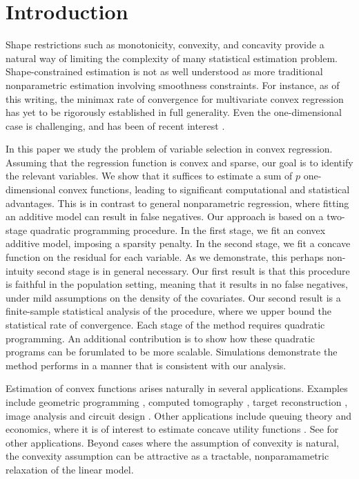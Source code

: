 \section{Introduction}


Shape restrictions such as monotonicity, convexity, and concavity
provide a natural way of limiting the complexity of many statistical
estimation problem.  Shape-constrained estimation is not as well
understood as more traditional nonparametric estimation involving
smoothness constraints.  For instance, as of this writing, the minimax
rate of convergence for multivariate convex regression has yet to be
rigorously established in full generality.  Even the one-dimensional
case is challenging, and has been of recent interest
\citep{guntusen:13}.

In this paper we study the problem of variable selection in convex
regression.  Assuming that the regression function is convex and
sparse, our goal is to identify the relevant variables.  We show that
it suffices to estimate a sum of $p$ one-dimensional convex functions,
leading to significant computational and statistical advantages.  This
is in contrast to general nonparametric regression, where fitting an
additive model can result in false negatives.  Our approach is based
on a two-stage quadratic programming procedure.  In the first stage,
we fit an convex additive model, imposing a sparsity penalty.  In the
second stage, we fit a concave function on the residual for each
variable.  As we demonstrate, this perhaps non-intuity second stage is
in general necessary.  Our first result is that this procedure is
faithful in the population setting, meaning that it results in no
false negatives, under mild assumptions on the density of the
covariates.  Our second result is a finite-sample statistical analysis
of the procedure, where we upper bound the statistical rate of
convergence.  Each stage of the method requires quadratic programming.
An additional contribution is to show how these quadratic programs can
be forumlated to be more scalable.  Simulations demonstrate the method
performs in a manner that is consistent with our analysis.

Estimation of convex functions arises naturally in several
applications.  Examples include geometric programming \citep{Boyd04},
computed tomography \citep{Prince:90}, target reconstruction
\citep{Lele:92}, image analysis \citep{Golden:06} and circuit design
\citep{Hannah:12}.  Other applications include queuing theory
\citep{Chen:01} and economics, where it is of interest to estimate
concave utility functions \citep{Pratt:68}.  See \cite{Lim:12} for
other applications.  
Beyond cases where the assumption of convexity is
natural, the convexity assumption can be attractive as a
tractable, nonparamametric relaxation of the linear model.  

